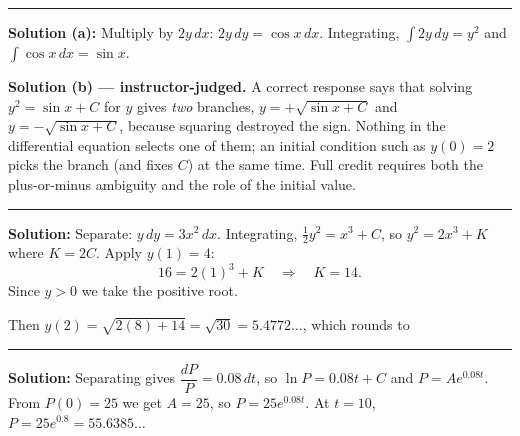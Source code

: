 \documentclass[12pt]{article}
\begin{document}
\vspace{0.2cm}\noindent\rule{\linewidth}{0.2pt}\vspace{0.2cm}


\textbf{Solution (a):} Multiply by $2y\,dx$: \; $2y\,dy = \cos x\,dx$. Integrating, $\displaystyle\int 2y\,dy = y^2$ and $\displaystyle\int \cos x\,dx = \sin x$. 

\textbf{Solution (b) --- instructor-judged.} A correct response says that solving $y^2 = \sin x + C$ for $y$ gives \emph{two} branches, $y = +\sqrt{\sin x + C}$ and $y = -\sqrt{\sin x + C}$, because squaring destroyed the sign. Nothing in the differential equation selects one of them; an initial condition such as $y(0) = 2$ picks the branch (and fixes $C$) at the same time. Full credit requires both the plus-or-minus ambiguity and the role of the initial value.

\vspace{0.2cm}\noindent\rule{\linewidth}{0.2pt}\vspace{0.2cm}


\textbf{Solution:} Separate: $y\,dy = 3x^2\,dx$. Integrating, $\tfrac{1}{2}y^2 = x^3 + C$, so $y^2 = 2x^3 + K$ where $K = 2C$. Apply $y(1) = 4$:
\[ 16 = 2(1)^3 + K \quad\Longrightarrow\quad K = 14. \]
Since $y > 0$ we take the positive root. 

Then $y(2) = \sqrt{2(8) + 14} = \sqrt{30} = 5.4772\ldots$, which rounds to 

\vspace{0.2cm}\noindent\rule{\linewidth}{0.2pt}\vspace{0.2cm}


\textbf{Solution:} Separating gives $\dfrac{dP}{P} = 0.08\,dt$, so $\ln P = 0.08t + C$ and $P = Ae^{0.08t}$. From $P(0) = 25$ we get $A = 25$, so $P = 25e^{0.08t}$. At $t = 10$, $P = 25e^{0.8} = 55.6385\ldots$ 
\end{document}
